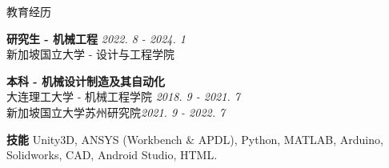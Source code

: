 \documentclass{resume} %
\begin{document}



\begin{rSection}{\fangsong 教育经历}

{\bf {\fangsong 研究生 - 机械工程}} \hfill {\em 2022. 8 - 2024. 1}\\ 
{\fangsong 新加坡国立大学 - 设计与工程学院}

{\bf {\fangsong 本科 - 机械设计制造及其自动化}} \\
{\fangsong 大连理工大学 - 机械工程学院} \hfill {\em {2018. 9 - 2021. 7}}\\
{\fangsong 新加坡国立大学苏州研究院}\hfill {\em 2021. 9 - 2022. 7}\\
\end{rSection}

\vspace{-1em}

\begin{rSection}{\bf{\fangsong 技能}}
Unity3D, ANSYS (Workbench $\&$ APDL), Python, MATLAB, Arduino, Solidworks, CAD, Android Studio, HTML.  \\
\end{rSection}
\end{document}

